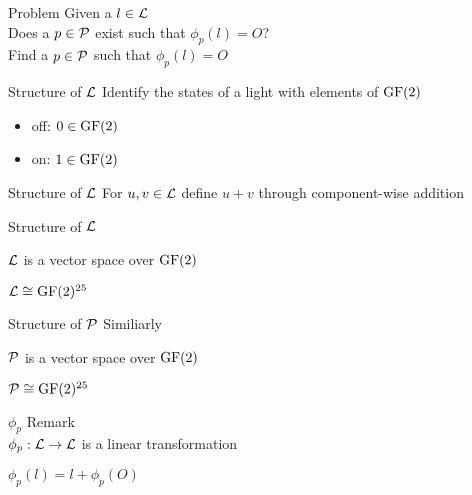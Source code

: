 \begin{frame}{Problem}
	Given a $l \in \mathcal{L}$\\
	Does a $p \in \mathcal{P}$ exist such that $\phi_{p}(l) = O$?\\
	
	\pause
	\bigskip
	Find a $p \in \mathcal{P}$ such that $\phi_{p}(l) = O$
\end{frame}

\begin{frame}{Structure of $\mathcal{L}$}
	Identify the states of a light with elements of $\operatorname{GF}(2)$
	\begin{itemize}
		\item off: $0 \in \operatorname{GF}(2)$
		\item on: $1 \in \operatorname{GF}(2)$
	\end{itemize}
\end{frame}

\begin{frame}{Structure of $\mathcal{L}$}
	For $u, v \in \mathcal{L}$ define $u + v$ through component-wise addition
\end{frame}

\begin{frame}{Structure of $\mathcal{L}$}
	\begin{theorem}
		$\mathcal{L}$ is a vector space over $\operatorname{GF}(2)$
	\end{theorem}
	
	\pause
	\bigskip
	\begin{corollary}
		$\mathcal{L} \cong \operatorname{GF}(2)^{25}$
	\end{corollary}
\end{frame}

\begin{frame}{Structure of $\mathcal{P}$}
	Similiarly
	
	\begin{theorem}
		$\mathcal{P}$ is a vector space over $\operatorname{GF}(2)$
	\end{theorem}
	
	\pause
	\bigskip	
	\begin{corollary}
		$\mathcal{P} \cong \operatorname{GF}(2)^{25}$
	\end{corollary}
\end{frame}

\begin{frame}{$\phi_{p}$}
	Remark\\
	$\phi_{p} : \mathcal{L} \rightarrow \mathcal{L}$ is  a linear transformation
	
	\pause
	\bigskip
	$\phi_{p}(l) = l + \phi_{p}(O)$
\end{frame}

